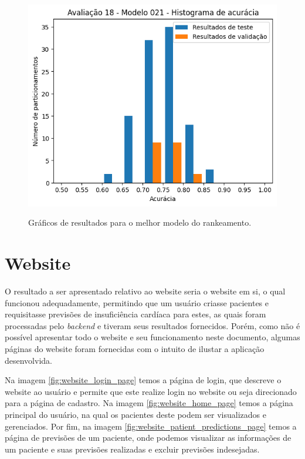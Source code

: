 \begin{figure}[h]
{    \includegraphics[scale=0.5]{images/histograma_resultados_melhor_modelo.png}
    \label{fig:best_results_histogram}
  }
	\caption{Gráficos de resultados para o melhor modelo do rankeamento.}
	\label{fig:best_results_plot}
\end{figure}

\section{Website}

O resultado a ser apresentado relativo ao website seria o website em si, o qual funcionou adequadamente, permitindo que um usuário criasse pacientes e requisitasse previsões de insuficiência cardíaca para estes, as quais foram processadas pelo \textit{backend} e tiveram seus resultados fornecidos. Porém, como não é possível apresentar todo o website e seu funcionamento neste documento, algumas páginas do website foram fornecidas com o intuito de ilustar a aplicação desenvolvida.

Na imagem \ref{fig:website_login_page} temos a página de login, que descreve o website ao usuário e permite que este realize login no website ou seja direcionado para a página de cadastro. Na imagem \ref{fig:website_home_page} temos a página principal do usuário, na qual os pacientes deste podem ser visualizados e gerenciados. Por fim, na imagem \ref{fig:website_patient_predictions_page} temos a página de previsões de um paciente, onde podemos visualizar as informações de um paciente e suas previsões realizadas e excluir previsões indesejadas.


